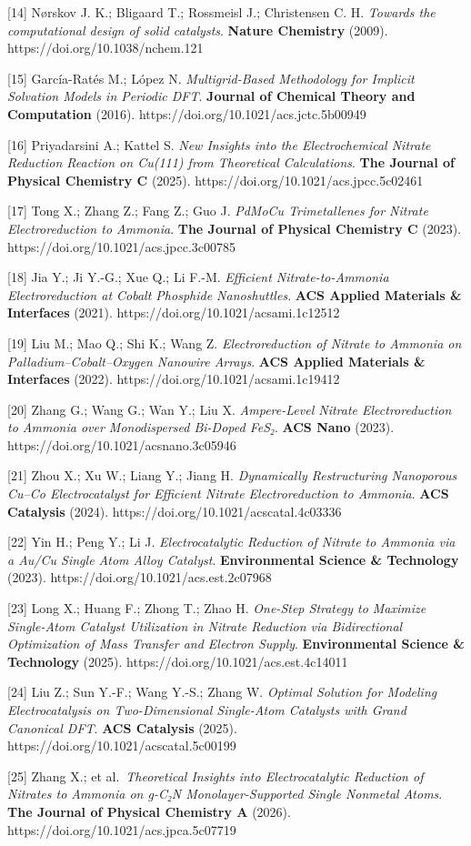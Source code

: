 \documentclass[
]{article}
\begin{document}
{[}14{]} Nørskov J. K.; Bligaard T.; Rossmeisl J.; Christensen C. H.
\emph{Towards the computational design of solid catalysts}.
\textbf{Nature Chemistry} (2009). https://doi.org/10.1038/nchem.121

{[}15{]} García-Ratés M.; López N. \emph{Multigrid-Based Methodology for
Implicit Solvation Models in Periodic DFT}. \textbf{Journal of Chemical
Theory and Computation} (2016). https://doi.org/10.1021/acs.jctc.5b00949

{[}16{]} Priyadarsini A.; Kattel S. \emph{New Insights into the
Electrochemical Nitrate Reduction Reaction on Cu(111) from Theoretical
Calculations}. \textbf{The Journal of Physical Chemistry C} (2025).
https://doi.org/10.1021/acs.jpcc.5c02461

{[}17{]} Tong X.; Zhang Z.; Fang Z.; Guo J. \emph{PdMoCu Trimetallenes
for Nitrate Electroreduction to Ammonia}. \textbf{The Journal of
Physical Chemistry C} (2023). https://doi.org/10.1021/acs.jpcc.3c00785

{[}18{]} Jia Y.; Ji Y.-G.; Xue Q.; Li F.-M. \emph{Efficient
Nitrate-to-Ammonia Electroreduction at Cobalt Phosphide Nanoshuttles}.
\textbf{ACS Applied Materials \& Interfaces} (2021).
https://doi.org/10.1021/acsami.1c12512

{[}19{]} Liu M.; Mao Q.; Shi K.; Wang Z. \emph{Electroreduction of
Nitrate to Ammonia on Palladium--Cobalt--Oxygen Nanowire Arrays}.
\textbf{ACS Applied Materials \& Interfaces} (2022).
https://doi.org/10.1021/acsami.1c19412

{[}20{]} Zhang G.; Wang G.; Wan Y.; Liu X. \emph{Ampere-Level Nitrate
Electroreduction to Ammonia over Monodispersed Bi-Doped FeS₂}.
\textbf{ACS Nano} (2023). https://doi.org/10.1021/acsnano.3c05946

{[}21{]} Zhou X.; Xu W.; Liang Y.; Jiang H. \emph{Dynamically
Restructuring Nanoporous Cu--Co Electrocatalyst for Efficient Nitrate
Electroreduction to Ammonia}. \textbf{ACS Catalysis} (2024).
https://doi.org/10.1021/acscatal.4c03336

{[}22{]} Yin H.; Peng Y.; Li J. \emph{Electrocatalytic Reduction of
Nitrate to Ammonia via a Au/Cu Single Atom Alloy Catalyst}.
\textbf{Environmental Science \& Technology} (2023).
https://doi.org/10.1021/acs.est.2c07968

{[}23{]} Long X.; Huang F.; Zhong T.; Zhao H. \emph{One-Step Strategy to
Maximize Single-Atom Catalyst Utilization in Nitrate Reduction via
Bidirectional Optimization of Mass Transfer and Electron Supply}.
\textbf{Environmental Science \& Technology} (2025).
https://doi.org/10.1021/acs.est.4c14011

{[}24{]} Liu Z.; Sun Y.-F.; Wang Y.-S.; Zhang W. \emph{Optimal Solution
for Modeling Electrocatalysis on Two-Dimensional Single-Atom Catalysts
with Grand Canonical DFT}. \textbf{ACS Catalysis} (2025).
https://doi.org/10.1021/acscatal.5c00199

{[}25{]} Zhang X.; et al.~\emph{Theoretical Insights into
Electrocatalytic Reduction of Nitrates to Ammonia on g-C₂N
Monolayer-Supported Single Nonmetal Atoms}. \textbf{The Journal of
Physical Chemistry A} (2026). https://doi.org/10.1021/acs.jpca.5c07719
\end{document}
